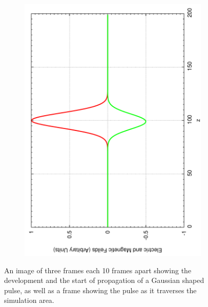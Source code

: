 \begin{figure}[ht]
\begin{subfigure}[ht]{0.45\textwidth}
                \includegraphics[angle=270, width=\textwidth]{initialguass4.pdf}
        \end{subfigure}
        \caption{An image of three frames each 10 frames apart showing the development and the start of propagation of a Gaussian shaped pulse, as well as a frame showing the pulse as it traverses the simulation area.}\label{fig:initialguass}
\end{figure}

